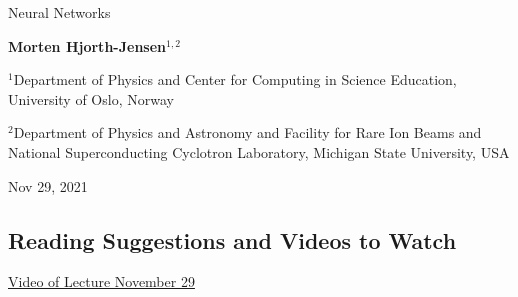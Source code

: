\documentclass[%
oneside,                 %
final,                   %
10pt]{article}
\begin{document}

\newcommand{\exercisesection}[1]{\subsection*{#1}}






\thispagestyle{empty}

\begin{center}
{\LARGE\bf
\begin{spacing}{1.25}
Neural Networks
\end{spacing}
}
\end{center}


\begin{center}
{\bf Morten Hjorth-Jensen${}^{1, 2}$} \\ [0mm]
\end{center}

\begin{center}
\centerline{{\small ${}^1$Department of Physics and Center for Computing in Science Education, University of Oslo, Norway}}
\centerline{{\small ${}^2$Department of Physics and Astronomy and Facility for Rare Ion Beams and National Superconducting Cyclotron Laboratory, Michigan State University, USA}}
\end{center}
    

\begin{center}
Nov 29, 2021
\end{center}

\vspace{1cm}


\subsection{Reading Suggestions and Videos to Watch}

\href{{https://www.uio.no/studier/emner/matnat/fys/FYS-STK3155/h21/forelesningsvideoer/LectureNovember29.mp4?vrtx=view-as-webpage}}{Video of Lecture November 29}
\end{document}
